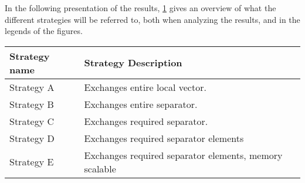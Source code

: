 
In the following presentation of the results, \ref{tab:commstratdesc} gives an overview of what the different strategies will be referred to, both when analyzing the results, and in the legends of the figures.

\begin{table}[H]
    \begin{center}
        \begin{tabular}[c]{|p{3cm}|p{9.5cm}|}
            \hline
             \textbf{Strategy name}& \textbf{Strategy Description}  \\
            \hline
             Strategy A&Exchanges entire local vector.  \\
            \hline
             Strategy B&Exchanges entire separator.  \\
            \hline
             Strategy C&Exchanges required separator.  \\
            \hline
             Strategy D&Exchanges required separator elements  \\
            \hline
             Strategy E&Exchanges required separator elements, memory scalable  \\
            \hline
        \end{tabular}
    \end{center}
    \label{tab:commstratdesc}
\end{table}

